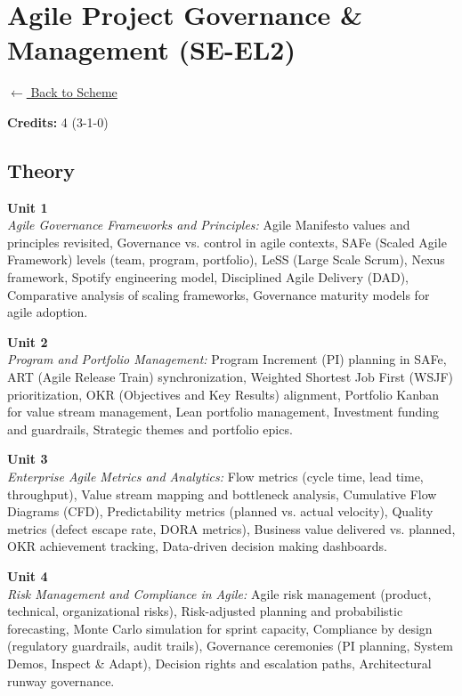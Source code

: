 \section*{Agile Project Governance \& Management (SE-EL2)}
\label{elec:SE_2}

\noindent \small{\hyperref[main:scheme]{$\leftarrow$ Back to Scheme}} \vspace{0.5cm}

\noindent \textbf{Credits:} 4 (3-1-0)

\subsection*{Theory}
\noindent\textbf{Unit 1} \\
\textit{Agile Governance Frameworks and Principles:} Agile Manifesto values and principles revisited, Governance vs. control in agile contexts, SAFe (Scaled Agile Framework) levels (team, program, portfolio), LeSS (Large Scale Scrum), Nexus framework, Spotify engineering model, Disciplined Agile Delivery (DAD), Comparative analysis of scaling frameworks, Governance maturity models for agile adoption.

\vspace{0.3cm}

\noindent\textbf{Unit 2} \\
\textit{Program and Portfolio Management:} Program Increment (PI) planning in SAFe, ART (Agile Release Train) synchronization, Weighted Shortest Job First (WSJF) prioritization, OKR (Objectives and Key Results) alignment, Portfolio Kanban for value stream management, Lean portfolio management, Investment funding and guardrails, Strategic themes and portfolio epics.

\vspace{0.3cm}

\noindent\textbf{Unit 3} \\
\textit{Enterprise Agile Metrics and Analytics:} Flow metrics (cycle time, lead time, throughput), Value stream mapping and bottleneck analysis, Cumulative Flow Diagrams (CFD), Predictability metrics (planned vs. actual velocity), Quality metrics (defect escape rate, DORA metrics), Business value delivered vs. planned, OKR achievement tracking, Data-driven decision making dashboards.

\vspace{0.3cm}

\noindent\textbf{Unit 4} \\
\textit{Risk Management and Compliance in Agile:} Agile risk management (product, technical, organizational risks), Risk-adjusted planning and probabilistic forecasting, Monte Carlo simulation for sprint capacity, Compliance by design (regulatory guardrails, audit trails), Governance ceremonies (PI planning, System Demos, Inspect \& Adapt), Decision rights and escalation paths, Architectural runway governance.

